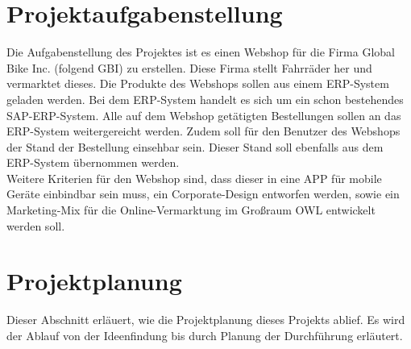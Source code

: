 \section{Projektaufgabenstellung}
Die Aufgabenstellung des Projektes ist es einen Webshop für die Firma Global Bike Inc. (folgend GBI) zu erstellen. Diese Firma stellt Fahrräder her und vermarktet dieses. Die Produkte des Webshops sollen aus einem ERP-System geladen werden. Bei dem ERP-System handelt es sich um ein schon bestehendes SAP-ERP-System. Alle auf dem Webshop getätigten Bestellungen sollen an das ERP-System weitergereicht werden. Zudem soll für den Benutzer des Webshops der Stand der Bestellung einsehbar sein. Dieser Stand soll ebenfalls aus dem ERP-System übernommen werden. \\
Weitere Kriterien für den Webshop sind, dass dieser in eine APP für mobile Geräte einbindbar sein muss, ein Corporate-Design entworfen werden, sowie ein Marketing-Mix für die Online-Vermarktung im Großraum OWL entwickelt werden soll.

\section{Projektplanung}
Dieser Abschnitt erläuert, wie die Projektplanung dieses Projekts ablief. Es wird der Ablauf von der Ideenfindung bis durch Planung der Durchführung erläutert.


